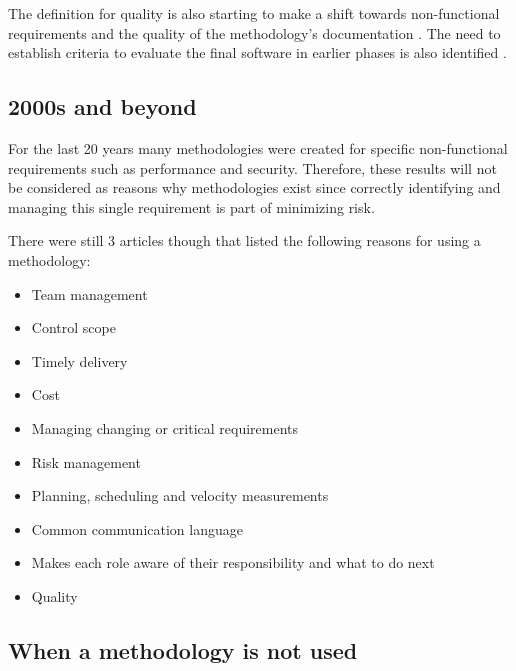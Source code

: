 The definition for quality is also starting to make a shift towards non-functional requirements and the quality of the methodology's documentation \cite{scarre_1992}.
The need to establish criteria to evaluate the final software in earlier phases is also identified \cite{paul_1993, herald_1993, grossman_1997}.


\subsection{2000s and beyond}
For the last 20 years many methodologies were created for specific non-functional requirements such as performance and security.
Therefore, these results will not be considered as reasons why methodologies exist since correctly identifying and managing this single requirement is part of minimizing risk.

There were still 3 articles though that listed the following reasons for using a methodology:  
\begin{itemize}
    \item Team management \cite{lucena_2008}
    \item Control scope \cite{lucena_2008}
    \item Timely delivery \cite{lucena_2008, garg_2015}
    \item Cost \cite{lucena_2008, uzturk_2013, garg_2015}
    \item Managing changing or critical requirements \cite{lucena_2008, uzturk_2013}
    \item Risk management \cite{lucena_2008, uzturk_2013, garg_2015}
    \item Planning, scheduling and velocity measurements \cite{uzturk_2013}
    \item Common communication language \cite{uzturk_2013}
    \item Makes each role aware of their responsibility and what to do next \cite{uzturk_2013}
    \item Quality \cite{garg_2015}
\end{itemize}

\subsection{When a methodology is not used}
